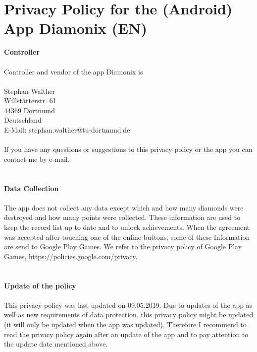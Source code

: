 \documentclass[a4paper,12pt]{article}
\makeatletter
\renewcommand\tableofcontents{%
    \@starttoc{toc}%
}
\makeatother
\begin{document}
\tableofcontents
\clearpage

\section{Privacy Policy for the (Android) App Diamonix (EN)}\normalsize
\bigskip
\textbf{Controller} \\
\\
Controller and vendor of the app Diamonix is \\
\\
Stephan Walther \\
Willst\"atterstr. 61 \\
44369 Dortmund \\
Deutschland \\
E-Mail: stephan.walther@tu-dortmund.de \\ 
\\
If you have any questions or suggestions to this privacy policy or the app you can
contact me by e-mail. \\
\\
\\
\textbf{Data Collection} \\
\\
The app does not collect any data except which and how many diamonds were destroyed and
how many points were collected. These information are used to keep the record list
up to date and to unlock achievements. When the agreement was accepted after touching
one of the online buttons, some of these Information are send to Google Play Games.
We refer to the privacy policy of Google Play Games, https://policies.google.com/privacy. \\
\\
\\
\textbf{Update of the policy} \\
\\
This privacy policy was last updated on 09.05.2019.
Due to updates of the app as well as new requirements of data protection, this privacy policy might be updated (it will only be updated when the app was updated). Therefore I recommend to read the privacy policy again after an update of the app and to pay attention to the update date mentioned above.


\clearpage
\setcounter{equation}{0} 
\end{document}
